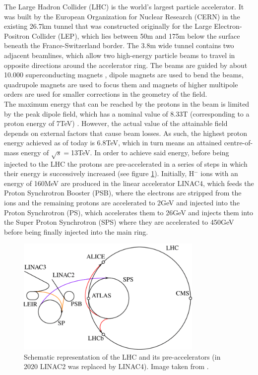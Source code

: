 \documentclass[main]{subfiles} %
\begin{document}
The Large Hadron Collider (LHC) \cite{Evans2008} is the world's largest particle accelerator. It was built by the European Organization for Nuclear Research (CERN) in the existing 26.7\;km tunnel that was constructed originally for the Large Electron-Positron Collider (LEP), which lies between 50\;m and 175\;m below the surface beneath the France-Switzerland border. The 3.8\;m wide tunnel contains two adjacent beamlines, which allow two high-energy particle beams to travel in opposite directions around the accelerator ring. The beams are guided by about 10.000 superconducting magnets \cite{MYERS2013}, dipole magnets are used to bend the beams, quadrupole magnets are used to focus them and magnets of higher multipole orders are used for smaller corrections in the geometry of the field.\\

The maximum energy that can be reached by the protons in the beam is limited by the peak dipole field, which has a nominal value of 8.33\;T (corresponding to a proton energy of 7\;TeV) \cite{Bruning2004}. However, the actual value of the attainable field depends on external factors that cause beam losses. As such, the highest proton energy achieved as of today is 6.8\;TeV, which in turn means an attained centre-of-mass energy of $\sqrt{s} = $13\;TeV. In order to achieve said energy, before being injected to the LHC the protons are pre-accelerated in a series of steps in which their energy is successively increased (see figure \ref{fig:preaccelerators}). Initially, H$^-$ ions with an energy of 160\;MeV are produced in the linear accelerator LINAC4, which feeds the Proton Synchrotron Booster (PSB), where the electrons are stripped from the ions and the remaining protons are accelerated to 2\;GeV and injected into the Proton Synchrotron (PS), which accelerates them to 26\;GeV and injects them into the Super Proton Synchrotron (SPS) where they are accelerated to 450\;GeV before being finally injected into the main ring.\\

\begin{figure}[h]
    \centering
    \includegraphics[width=0.8\textwidth]{../Figures/Theory/LHC_preaccelerators.png}
    \caption{Schematic representation of the LHC and its pre-accelerators (in 2020 LINAC2 was replaced by LINAC4). Image taken from \cite{Michael2011}.}
    \label{fig:preaccelerators}
\end{figure}
\end{document}
